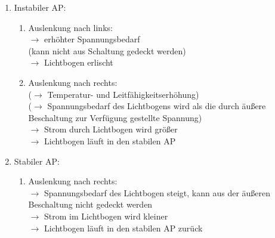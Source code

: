 \documentclass[a4paper,twocolumn,10pt]{article}
\begin{document}
\begin{enumerate}[label=$\bullet$]
\item Instabiler AP:
\begin{enumerate}[label=-]
\item Auslenkung nach links:\\
$\rightarrow$ erhöhter Spannungsbedarf\\
(kann nicht aus Schaltung gedeckt werden)\\
$\rightarrow$ Lichtbogen erlischt
\item Auslenkung nach rechts:\\
($\rightarrow$ Temperatur- und Leitfähigkeitserhöhung)\\
($\rightarrow$ Spannungsbedarf des Lichtbogens wird als die durch äußere Beschaltung zur Verfügung gestellte Spannung)\\
$\rightarrow$ Strom durch Lichtbogen wird größer\\
$\rightarrow$ Lichtbogen läuft in den stabilen AP
\end{enumerate}
\item Stabiler AP:
\begin{enumerate}[label=-]
\item Auslenkung nach rechts:\\
$\rightarrow$ Spannungsbedarf des Lichtbogen steigt, kann aus der äußeren Beschaltung nicht gedeckt werden\\
$\rightarrow$ Strom im Lichtbogen wird kleiner\\
$\rightarrow$ Lichtbogen läuft in den stabilen AP zurück
\end{enumerate}
\end{enumerate}

\newpage
\end{document}
